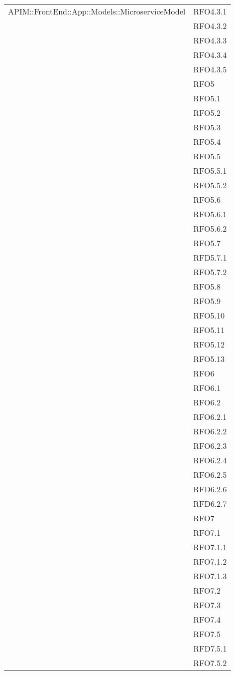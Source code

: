 \begin{longtable}{ p{12cm} | p{4cm} }
			\hline
			APIM::FrontEnd::App::Models::MicroserviceModel
			& RFO4.3.1 \\
			& RFO4.3.2 \\
			& RFO4.3.3 \\
			& RFO4.3.4 \\
			& RFO4.3.5 \\
			& RFO5 \\
			& RFO5.1 \\
			& RFO5.2 \\
			& RFO5.3 \\
			& RFO5.4 \\
			& RFO5.5 \\
			& RFO5.5.1 \\
			& RFO5.5.2 \\
			& RFO5.6 \\
			& RFO5.6.1 \\
			& RFO5.6.2 \\
			& RFO5.7 \\
			& RFD5.7.1 \\
			& RFO5.7.2 \\
			& RFO5.8 \\
			& RFO5.9 \\
			& RFO5.10 \\
			& RFO5.11 \\
			& RFO5.12 \\
			& RFO5.13 \\
			& RFO6 \\
			& RFO6.1 \\
			& RFO6.2 \\
			& RFO6.2.1 \\
			& RFO6.2.2 \\
			& RFO6.2.3 \\
			& RFO6.2.4 \\
			& RFO6.2.5 \\
			& RFD6.2.6 \\
			& RFD6.2.7 \\
			& RFO7 \\
			& RFO7.1 \\
			& RFO7.1.1 \\
			& RFO7.1.2 \\
			& RFO7.1.3 \\
			& RFO7.2 \\
			& RFO7.3 \\
			& RFO7.4 \\
			& RFO7.5 \\
			& RFD7.5.1 \\
			& RFO7.5.2 \\

\end{longtable}
